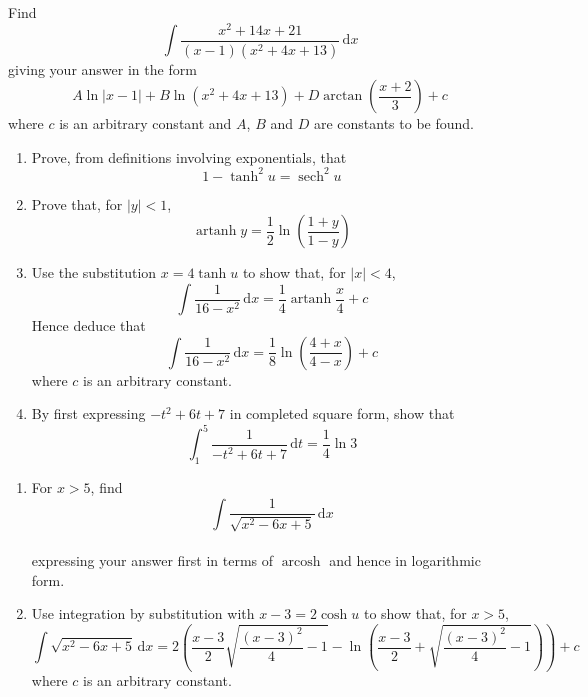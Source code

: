 \documentclass[leqno]{article}
\begin{document}
\begin{enumerate}[
  label=\textbf{\arabic*.},
  leftmargin=*,
  topsep=0pt,
  partopsep=0pt,
  parsep=0pt
]
\newpage

\questionitem

Find
\[
\int \frac{x^2+14x+21}{(x-1)(x^2+4x+13)}\,\mathrm{d}x
\]
giving your answer in the form
\[
A\ln|x-1|+B\ln(x^2+4x+13)+D\arctan\left(\frac{x+2}{3}\right)+c
\]
where $c$ is an arbitrary constant and $A$, $B$ and $D$ are constants to be found.  \\

\newpage

\questionitem

\begin{enumerate}[label=(\roman*)]
  \item Prove, from definitions involving exponentials, that
  \[
  1-\tanh^2u=\operatorname{sech}^2u
  \]
  \item Prove that, for $|y|<1$,
  \[
  \operatorname{artanh}y=\frac{1}{2}\ln\left(\frac{1+y}{1-y}\right)
  \]
  \item Use the substitution $x=4\tanh u$ to show that, for $|x|<4$,
  \[
  \int \frac{1}{16-x^2}\,\mathrm{d}x=\frac{1}{4}\operatorname{artanh}\frac{x}{4}+c
  \]
  Hence deduce that
  \[
  \int \frac{1}{16-x^2}\,\mathrm{d}x=\frac{1}{8}\ln\left(\frac{4+x}{4-x}\right)+c
  \]
  where $c$ is an arbitrary constant.  \\
  \item By first expressing $-t^2+6t+7$ in completed square form, show that
  \[
  \int_{1}^{5} \frac{1}{-t^2+6t+7}\,\mathrm{d}t=\frac{1}{4}\ln 3
  \]
\end{enumerate}

\newpage

\questionitem

\begin{enumerate}[label=(\roman*), start=1]
  \item For $x>5$, find
  \[
  \int \frac{1}{\sqrt{x^2-6x+5}}\,\mathrm{d}x
  \] \\
  expressing your answer first in terms of $\operatorname{arcosh}$ and hence in logarithmic form.  \\
  \item Use integration by substitution with $x-3=2\cosh u$ to show that, for $x>5$,
  \[
  \int \sqrt{x^2-6x+5}\,\mathrm{d}x=2\left(\frac{x-3}{2}\sqrt{\frac{(x-3)^2}{4}-1}-\ln\left(\frac{x-3}{2}+\sqrt{\frac{(x-3)^2}{4}-1}\right)\right)+c
  \]
  where $c$ is an arbitrary constant.  \\
\end{enumerate}

\end{enumerate}
\end{document}
